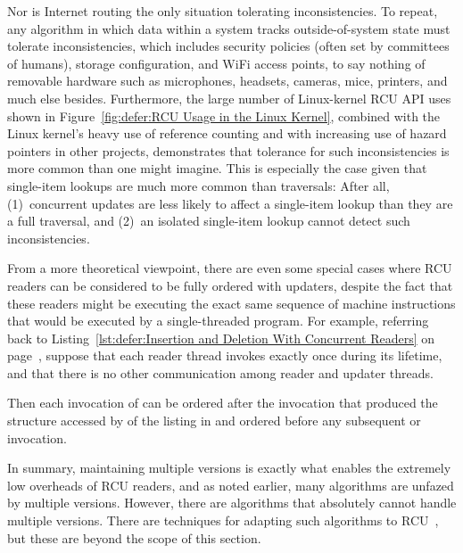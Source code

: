 Nor is Internet routing the only situation tolerating inconsistencies.
To repeat, any algorithm in which data within a system tracks
outside-of-system state must tolerate inconsistencies, which includes
security policies (often set by committees of humans), storage configuration,
and WiFi access points, to say nothing of removable hardware such as
microphones, headsets, cameras, mice, printers, and much else besides.
Furthermore, the large number of Linux-kernel RCU API uses shown in
Figure~\ref{fig:defer:RCU Usage in the Linux Kernel},
combined with the Linux kernel's heavy use of reference counting
and with increasing use of hazard pointers in other projects, demonstrates
that tolerance for such inconsistencies is more common than one might
imagine.
This is especially the case given that single-item lookups are much more
common than traversals:  After all, (1)~concurrent updates are less likely
to affect a single-item lookup than they are a full traversal, and
(2)~an isolated single-item lookup cannot detect such inconsistencies.

From a more theoretical viewpoint, there are even some special cases where
RCU readers can be considered to be fully ordered with updaters, despite
the fact that these readers might be executing the exact same sequence of
machine instructions that would be executed by a single-threaded program.
For example, referring back to
Listing~\ref{lst:defer:Insertion and Deletion With Concurrent Readers}
on page~\pageref{lst:defer:Insertion and Deletion With Concurrent Readers},
suppose that each reader thread invokes  exactly
once during its lifetime, and that there is no other communication among
reader and updater threads.
\begin{fcvref}
Then each invocation of  can be ordered after the
 invocation that produced the  structure
accessed by  of the listing in 
and ordered before any subsequent
 or  invocation.
\end{fcvref}

In summary, maintaining multiple versions is exactly what enables the
extremely low overheads of RCU readers, and as noted earlier, many
algorithms are unfazed by multiple versions.
However, there are algorithms that absolutely cannot handle multiple versions.
There are techniques for adapting such algorithms to
RCU~\cite{PaulEdwardMcKenneyPhD},
but these are beyond the scope of this section.

